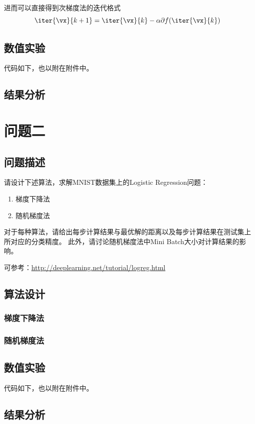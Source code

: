 \documentclass[logo,reportComp]{thesis}
\begin{document}
进而可以直接得到次梯度法的迭代格式
\begin{equation}
\iter{\vx}{k+1}=\iter{\vx}{k}-\alpha\partial f(\iter{\vx}{k})
\end{equation}

\subsection{数值实验}
代码如下，也以附在附件中。

\subsection{结果分析}

\section{问题二}
\subsection{问题描述}
请设计下述算法，求解MNIST数据集上的Logistic Regression问题：
\begin{enumerate}
    \item 梯度下降法
    \item 随机梯度法
\end{enumerate}

对于每种算法，请给出每步计算结果与最优解的距离以及每步计算结果在测试集上所对应的分类精度。
此外，请讨论随机梯度法中Mini Batch大小对计算结果的影响。

可参考：\url{http://deeplearning.net/tutorial/logreg.html}


\subsection{算法设计}
\subsubsection{梯度下降法}


\subsubsection{随机梯度法}


\subsection{数值实验}
代码如下，也以附在附件中。


\subsection{结果分析}
\end{document}
